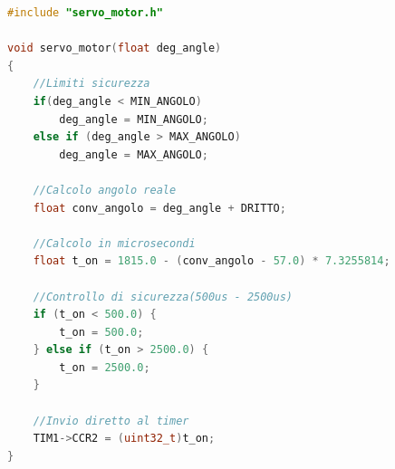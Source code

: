 \documentclass[11pt]{report}
\begin{document}
\begin{lstlisting}[language=Cpp, caption={servo\_motor.c}]
#include "servo_motor.h"

void servo_motor(float deg_angle)
{
    //Limiti sicurezza
    if(deg_angle < MIN_ANGOLO)
        deg_angle = MIN_ANGOLO;
    else if (deg_angle > MAX_ANGOLO)
        deg_angle = MAX_ANGOLO;

    //Calcolo angolo reale
    float conv_angolo = deg_angle + DRITTO;

    //Calcolo in microsecondi
    float t_on = 1815.0 - (conv_angolo - 57.0) * 7.3255814;

    //Controllo di sicurezza(500us - 2500us)
    if (t_on < 500.0) {
        t_on = 500.0;
    } else if (t_on > 2500.0) {
        t_on = 2500.0;
    }

    //Invio diretto al timer
    TIM1->CCR2 = (uint32_t)t_on;
}
\end{lstlisting}
\end{document}
